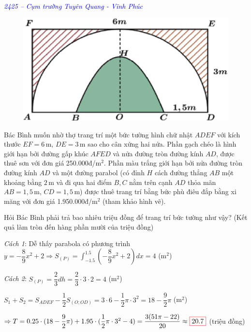 \documentclass[twoside,final]{hcmut-report}
\newcommand{\exercise}[1]{\begin{exercisebox}#1\end{exercisebox}}
\newcommand{\result}[1]{\fcolorbox{red}{white}{#1}}
\begin{document}
\exercise{
    \textcolor{blue}{\textit{2425 -- Cụm trường Tuyên Quang - Vĩnh Phúc}}

    \begin{figure}
        \centering
        \includegraphics*[width=1.03\linewidth]{images/XSTK/TQ-VP-2.png}
    \end{figure}

    Bác Bình muốn nhờ thợ trang trí một bức tường hình chữ nhật $ADEF$ với kích thước $EF = 6\,\text{m}$, $DE = 3\,\text{m}$ sao cho cân xứng hai nửa. Phần gạch chéo là hình giới hạn bởi đường gấp khúc $AFED$ và nửa đường tròn đường kính $AD$, được thuê sơn với đơn giá 250.000đ/m$^2$. Phần màu trắng giới hạn bởi nửa đường tròn đường kính $AD$ và một đường parabol (có đỉnh $H$ cách đường thẳng $AB$ một khoảng bằng $2\,\text{m}$ và đi qua hai điểm $B, C$ nằm trên cạnh $AD$ thỏa mãn $AB = 1{,}5\,\text{m}$, $CD = 1{,}5\,\text{m}$) được thuê trang trí bằng bức phù điêu đắp bằng xi măng với đơn giá 1.950.000đ/m$^2$ (tham khảo hình vẽ).

    Hỏi Bác Bình phải trả bao nhiêu triệu đồng để trang trí bức tường như vậy? (Kết quả làm tròn đến hàng phần mười của triệu đồng)
}
\textit{Cách 1}: Dễ thấy parabola có phương trình $y = -\dfrac{8}{9}x^2 + 2 \Rightarrow S_{(P)} = \displaystyle \int_{-1.5}^{1.5}(-\dfrac{8}{9}x^2 + 2)dx = 4$ (m$^2$)\par
\textit{Cách 2}: $S_{(P)} = \dfrac{2}{3}dh = \dfrac{2}{3}\cdot 3\cdot 2 = 4$ (m$^2$)\par
$S_1 + S_2 = S_{ADEF} - \dfrac{1}{2}S_{(O; OD)} = 3\cdot 6 - \dfrac{1}{2}\pi\cdot 3^2 = 18 - \dfrac{9}{2}\pi$ (m$^2$)\par
$\Rightarrow T = 0.25\cdot(18 - \dfrac{9}{2}\pi) + 1.95\cdot (\dfrac{1}{2}\pi\cdot 3^2 - 4) = \dfrac{3(51\pi-22)}{20} \approx \result{20.7}$ (triệu đồng)
\end{document}
